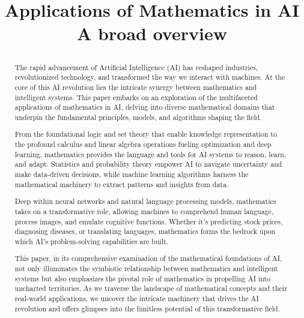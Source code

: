 \documentclass[conference]{IEEEtran}
\begin{document}
    \title{Applications of Mathematics in AI\\{
    \large A broad overview
    }

        }

    \author{

    }

    \maketitle

    \begin{abstract}
      The rapid advancement of Artificial Intelligence (AI) has reshaped industries, revolutionized technology, and transformed the way we interact with machines. At the core of this AI revolution lies the intricate synergy between mathematics and intelligent systems. This paper embarks on an exploration of the multifaceted applications of mathematics in AI, delving into diverse mathematical domains that underpin the fundamental principles, models, and algorithms shaping the field.

From the foundational logic and set theory that enable knowledge representation to the profound calculus and linear algebra operations fueling optimization and deep learning, mathematics provides the language and tools for AI systems to reason, learn, and adapt. Statistics and probability theory empower AI to navigate uncertainty and make data-driven decisions, while machine learning algorithms harness the mathematical machinery to extract patterns and insights from data.

Deep within neural networks and natural language processing models, mathematics takes on a transformative role, allowing machines to comprehend human language, process images, and emulate cognitive functions. Whether it's predicting stock prices, diagnosing diseases, or translating languages, mathematics forms the bedrock upon which AI's problem-solving capabilities are built.

This paper, in its comprehensive examination of the mathematical foundations of AI, not only illuminates the symbiotic relationship between mathematics and intelligent systems but also emphasizes the pivotal role of mathematics in propelling AI into uncharted territories. As we traverse the landscape of mathematical concepts and their real-world applications, we uncover the intricate machinery that drives the AI revolution and offers glimpses into the limitless potential of this transformative field.
    \end{abstract}
\end{document}
